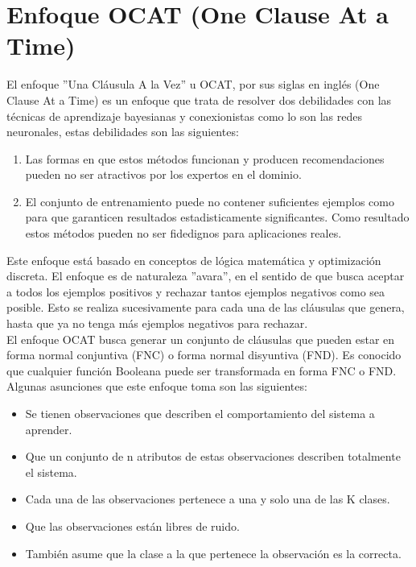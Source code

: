 \section{Enfoque OCAT (One Clause At a Time)}

El enfoque ''Una Cláusula A la Vez'' u OCAT, por sus siglas en inglés (One Clause At a Time) es un enfoque que trata de resolver dos debilidades con las técnicas de aprendizaje bayesianas y conexionistas como lo son las redes neuronales, estas debilidades son las siguientes:

\begin{enumerate}
	\item Las formas en que estos métodos funcionan y producen recomendaciones pueden no ser atractivos por los expertos en el dominio. 
	\item El conjunto de entrenamiento puede no contener suficientes ejemplos como para que garanticen resultados estadisticamente significantes. Como resultado estos métodos pueden no ser fidedignos para aplicaciones reales. 
\end{enumerate}

Este enfoque está basado en conceptos de lógica matemática y optimización discreta. El enfoque es de naturaleza ''avara'', en el sentido de que busca aceptar a todos los ejemplos positivos y rechazar tantos ejemplos negativos como sea posible. Esto se realiza sucesivamente para cada una de las cláusulas que genera, hasta que ya no tenga más ejemplos negativos para rechazar.
\\
El enfoque OCAT busca generar un conjunto de cláusulas que pueden estar en forma normal conjuntiva (FNC) o forma normal disyuntiva (FND). Es conocido \citep{peysakh1987fast} que cualquier función Booleana puede ser transformada en forma FNC o FND. 
\\
Algunas asunciones que este enfoque toma son las siguientes:

\begin{itemize}
	\item Se tienen observaciones que describen el comportamiento del sistema a aprender.
	\item Que un conjunto de n atributos de estas observaciones describen totalmente el sistema.
	\item Cada una de las observaciones pertenece a una y solo una de las K clases.
	\item Que las observaciones están libres de ruido.
	\item También asume que la clase a la que pertenece la observación es la correcta. 
\end{itemize}

